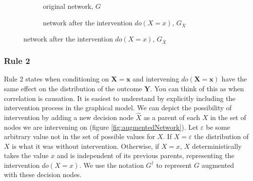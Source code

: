 \documentclass[11pt,a4paper,oneside]{book}
\let\epsilon\varepsilon
\begin{document}
\begin{figure}[h]
\centering
\caption{Intervention in a causal bayesian network}
\label{fig:mutilatednet}
\begin{subfigure}[t]{0.3\textwidth}
\centering
\caption{original network, $G$}
\label{fig:mutilatedOriginal}
\end{subfigure}
\begin{subfigure}[t]{0.5\textwidth}
\centering
\caption{network after the intervention $do(X=x)$, $G_{\overline{X}}$}
\label{fig:mutilatedAfter}
\end{subfigure}
\end{figure}

\subsubsection*{Rule 2}
Rule 2 states when conditioning on $\boldsymbol{X} = \boldsymbol{x}$ and intervening  $do(\boldsymbol{X}=\boldsymbol{x})$ have the same effect on the distribution of the outcome $\boldsymbol{Y}$. You can think of this as when correlation is causation. It is easiest to understand by explicitly including the intervention process in the graphical model. We can depict the possibility of intervention by adding a new decision node $\hat{X}$ as a parent of each $X$ in the set of nodes we are intervening on (figure \ref{fig:augmentedNetwork}). Let $\epsilon$ be some arbitrary value not in the set of possible values for $X$. If $X = \epsilon$ the distribution of $X$ is what it was without intervention. Otherwise, if $X=x$, $X$ deterministically takes the value $x$ and is independent of its previous parents, representing the intervention $do(X=x)$. We use the notation $G^{\dagger}$ to represent $G$ augmented with these decision nodes. 
\end{document}
